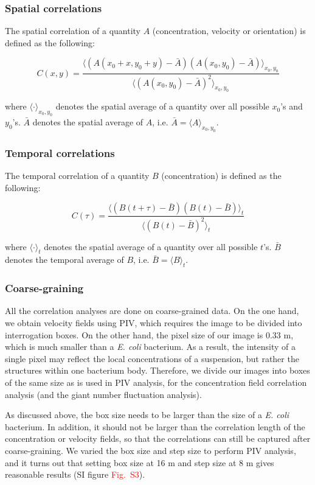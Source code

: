 \documentclass[preprint,aps,prl,amsmath,amssymb,longbibliography]{revtex4-2}
\begin{document}
\subsubsection{Spatial correlations}

The spatial correlation of a quantity $A$ (concentration, velocity or orientation) is defined as the following:

$$ C(x, y) = \frac{\langle(A(x_0+x, y_0+y)-\bar A)(A(x_0, y_0)-\bar A) \rangle_{x_0, y_0}}{\langle(A(x_0, y_0)-\bar A)^2\rangle_{x_0, y_0}}$$

where $\langle\cdot\rangle_{x_0, y_0}$ denotes the spatial average of a quantity over all possible $x_0$'s and $y_0$'s.  $\bar A$ denotes the spatial average of $A$, i.e. $\bar A=\langle A\rangle_{x_0, y_0}$.

\subsubsection{Temporal correlations}
The temporal correlation of a quantity $B$ (concentration) is defined as the following:

$$ C(\tau) = \frac{\langle (B(t+\tau)-\bar B)(B(t)-\bar B)\rangle_t}{\langle(B(t)-\bar B)^2\rangle_t} $$

where $\langle\cdot\rangle_{t}$ denotes the spatial average of a quantity over all possible $t$'s.  $\bar B$ denotes the temporal average of $B$, i.e. $\bar B=\langle B\rangle_{t}$.

\subsubsection{Coarse-graining}
All the correlation analyses are done on coarse-grained data. On the one hand, we obtain velocity fields using PIV, which requires the image to be divided into interrogation boxes. On the other hand, the pixel size of our image is 0.33 \textmu m, which is much smaller than a \textit{E. coli} bacterium. As a result, the intensity of a single pixel may reflect the local concentrations of a suspension, but rather the structures within one bacterium body. Therefore, we divide our images into boxes of the same size as is used in PIV analysis, for the concentration field correlation analysis (and the giant number fluctuation analysis).

As discussed above, the box size needs to be larger than the size of a \textit{E. coli} bacterium. In addition, it should not be larger than the correlation length of the concentration or velocity fields, so that the correlations can still be captured after coarse-graining. We varied the box size and step size to perform PIV analysis, and it turns out that setting box size at 16 \textmu m and step size at 8 \textmu m gives reasonable results (SI figure \textcolor{red}{Fig.~S3}).
\end{document}
